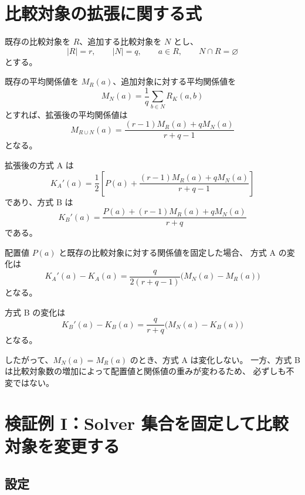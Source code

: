 \documentclass[a4paper,11pt]{ltjsarticle}
\begin{document}
\section{比較対象の拡張に関する式}

既存の比較対象を $R$、追加する比較対象を $N$ とし、
\begin{equation}
  |R|=r,\qquad |N|=q,\qquad
  a\in R,\qquad N\cap R=\varnothing
\end{equation}
とする。

既存の平均関係値を $M_R(a)$、追加対象に対する平均関係値を
\begin{equation}
  M_N(a)=\frac1q\sum_{b\in N}R_K(a,b)
\end{equation}
とすれば、拡張後の平均関係値は
\begin{equation}
  M_{R\cup N}(a)
  =
  \frac{(r-1)M_R(a)+qM_N(a)}{r+q-1}
\end{equation}
となる。

拡張後の方式 A は
\begin{equation}
  K_A'(a)
  =
  \frac12
  \left[
    P(a)+
    \frac{(r-1)M_R(a)+qM_N(a)}{r+q-1}
  \right]
\end{equation}
であり、方式 B は
\begin{equation}
  K_B'(a)
  =
  \frac{
    P(a)+(r-1)M_R(a)+qM_N(a)
  }{r+q}
\end{equation}
である。

配置値 $P(a)$ と既存の比較対象に対する関係値を固定した場合、
方式 A の変化は
\begin{equation}
  \boxed{
  K_A'(a)-K_A(a)
  =
  \frac{q}{2(r+q-1)}
  \bigl(M_N(a)-M_R(a)\bigr)
  }
\end{equation}
となる。

方式 B の変化は
\begin{equation}
  \boxed{
  K_B'(a)-K_B(a)
  =
  \frac{q}{r+q}
  \bigl(M_N(a)-K_B(a)\bigr)
  }
\end{equation}
となる。

したがって、$M_N(a)=M_R(a)$ のとき、方式 A は変化しない。
一方、方式 B は比較対象数の増加によって配置値と関係値の重みが変わるため、
必ずしも不変ではない。

\section{検証例 I：Solver 集合を固定して比較対象を変更する}

\subsection{設定}
\end{document}
